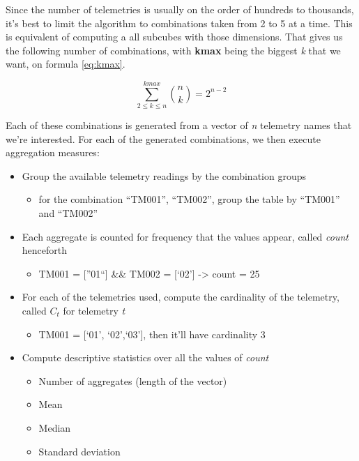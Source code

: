 Since the number of telemetries is usually on the order of hundreds to thousands, it's best to limit the algorithm to combinations taken from 2 to 5 at a time.
This is equivalent of computing a all subcubes with those dimensions.
That gives us the following number of combinations, with \textbf{kmax} being the biggest \emph{k} that we want, on formula \ref{eq:kmax}.

\begin{equation} \label{eq:kmax}
\sum_{2\leq{k}\leq{n}}^{kmax}\binom nk = 2^{n-2}
\end{equation}

Each of these combinations is generated from a vector of \emph{n} telemetry names that we're interested.
For each of the generated combinations, we then execute aggregation measures:

\begin{itemize}[noitemsep]
\item
  Group the available telemetry readings by the combination groups
  \begin{itemize}
  \item
    for the combination ``TM001'', ``TM002'', group the table by ``TM001'' and ``TM002''
  \end{itemize}
\item
  Each aggregate is counted for frequency that the values appear, called \emph{count} henceforth

  \begin{itemize}
  \item
    TM001 = [''01``] \&\& TM002 = [`02'] -\textgreater{} count = 25
  \end{itemize}
\item
  For each of the telemetries used, compute the cardinality of the telemetry, called \(C_t\) for telemetry \emph{t}

  \begin{itemize}
  \item
    TM001 = [`01', `02',`03'], then it'll have cardinality 3
  \end{itemize}
\item
  Compute descriptive statistics over all the values of \emph{count}

  \begin{itemize}[noitemsep]
  \item Number of aggregates (length of the vector)
  \item Mean
  \item Median
  \item Standard deviation
  \end{itemize}
\end{itemize}

